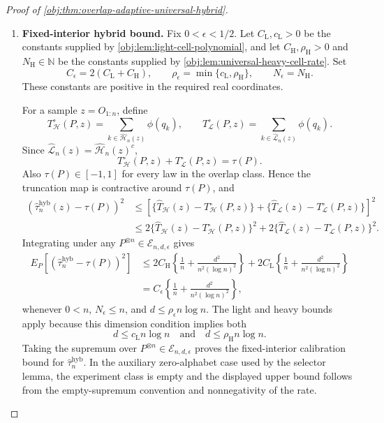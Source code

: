 \begin{proof}[Proof of \cref{obj:thm:overlap-adaptive-universal-hybrid}]
\begin{enumerate}
\item \textbf{Fixed-interior hybrid bound.}
Fix \(0<\epsilon<1/2\).  Let \(C_{\mathrm L},c_{\mathrm L}>0\) be the constants supplied by \cref{obj:lem:light-cell-polynomial}, and let \(C_{\mathrm H},\rho_{\mathrm H}>0\) and \(N_{\mathrm H}\in\mathbb N\) be the constants supplied by \cref{obj:lem:universal-heavy-cell-rate}.  Set
\[
C_\epsilon=2(C_{\mathrm L}+C_{\mathrm H}),
\qquad
\rho_\epsilon=\min\{c_{\mathrm L},\rho_{\mathrm H}\},
\qquad
N_\epsilon=N_{\mathrm H}.
\]
These constants are positive in the required real coordinates.

For a sample \(z=O_{1:n}\), define
\[
T_{\mathcal H}^{\circ}(P,z)
=
\sum_{k\in\widehat{\mathcal H}_n(z)}\phi(q_k),
\qquad
T_{\mathcal L}^{\circ}(P,z)
=
\sum_{k\in\widehat{\mathcal L}_n(z)}\phi(q_k).
\]
Since \(\widehat{\mathcal L}_n(z)=\widehat{\mathcal H}_n(z)^c\),
\[
T_{\mathcal H}^{\circ}(P,z)+T_{\mathcal L}^{\circ}(P,z)=\tau(P).
\]
Also \(\tau(P)\in[-1,1]\) for every law in the overlap class.  Hence the truncation map is contractive around \(\tau(P)\), and
\[
\begin{aligned}
\left(\widehat\tau_n^{\mathrm{hyb}}(z)-\tau(P)\right)^2
&\le
\left[
\{\widehat T_{\mathcal H}(z)-T_{\mathcal H}^{\circ}(P,z)\}
+
\{\widehat T_{\mathcal L}(z)-T_{\mathcal L}^{\circ}(P,z)\}
\right]^2  \\
&\le
2\{\widehat T_{\mathcal H}(z)-T_{\mathcal H}^{\circ}(P,z)\}^2
+
2\{\widehat T_{\mathcal L}(z)-T_{\mathcal L}^{\circ}(P,z)\}^2 .
\end{aligned}
\]
Integrating under any \(P^{\otimes n}\in\mathcal E_{n,d,\epsilon}\) gives
\[
\begin{aligned}
E_P\!\left[
\left(\widehat\tau_n^{\mathrm{hyb}}-\tau(P)\right)^2
\right]
&\le
2C_{\mathrm H}\left\{\frac1n+\frac{d^2}{n^2(\log n)^2}\right\}
+
2C_{\mathrm L}\left\{\frac1n+\frac{d^2}{n^2(\log n)^2}\right\}  \\
&=
C_\epsilon\left\{\frac1n+\frac{d^2}{n^2(\log n)^2}\right\},
\end{aligned}
\]
whenever \(0<n\), \(N_\epsilon\le n\), and \(d\le\rho_\epsilon n\log n\).  The light and heavy bounds apply because this dimension condition implies both
\[
d\le c_{\mathrm L}n\log n
\quad\text{and}\quad
d\le \rho_{\mathrm H}n\log n .
\]
Taking the supremum over \(P^{\otimes n}\in\mathcal E_{n,d,\epsilon}\) proves the fixed-interior calibration bound for \(\widehat\tau_n^{\mathrm{hyb}}\).  In the auxiliary zero-alphabet case used by the selector lemma, the experiment class is empty and the displayed upper bound follows from the empty-supremum convention and nonnegativity of the rate.


\end{enumerate}
\end{proof}
